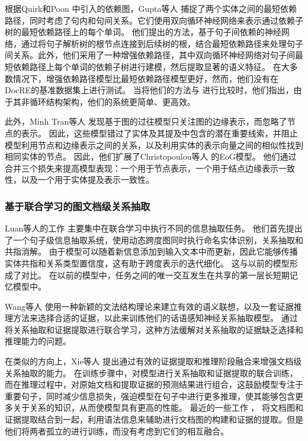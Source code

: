 \documentclass[bachelor]{thesis-uestc}
\begin{document}
根据Quirk和Poon \cite{quirk-poon-2017-distant} 中引入的依赖图，Gupta等人 \cite{Gupta_Rajaram_Schütze_Runkler_2019} 捕捉了两个实体之间的最短依赖路径，同时考虑了句内和句间关系。它们使用双向循环神经网络来表示通过依赖子树的最短依赖路径上的每个单词。
他们提出的方法，基于句子间依赖的神经网络，通过将句子解析树的根节点连接到后续树的根，结合最短依赖路径来处理句子间关系。此外，他们采用了一种增强依赖路径，其中双向循环神经网络对句子间最短依赖路径上每个单词的依赖子树进行建模，然后提取显著的语义特征。
在大多数情况下，增强依赖路径模型比最短依赖路径模型更好，然而，他们没有在DocRE的基准数据集上进行测试。
当将他们的方法与 \cite{peng-etal-2017-cross}进行比较时，他们指出，由于其非循环结构架构，他们的系统更简单、更高效。\par

此外，Minh Tran等人 \cite{minh-tran-etal-2020-dots}发现基于图的过往模型只关注图的边缘表示，而忽略了节点的表示。
因此，这些模型错过了实体及其提及中包含的潜在重要线索，并阻止模型利用节点和边缘表示之间的关系，以及利用实体的表示向量之间的相似性找到相同实体的节点。
因此，他们扩展了Christopoulou等人 \cite{christopoulou-etal-2019-connecting}的EoG模型。
他们通过合并三个损失来提高模型表现：一个用于节点表示，一个用于结点边缘表示一致性，以及一个用于实体提及表示一致性。\par

\subsubsection{基于联合学习的图文档级关系抽取}\label{subsec:joined-graph}

Luan等人的工作 \cite{luan-etal-2019-general}主要集中在联合学习中执行不同的信息抽取任务。
他们首先提出了一个句子级信息抽取系统，使用动态跨度图同时执行命名实体识别，关系抽取和共指消解。
由于模型可以随着新信息添加到输入文本中而更新，因此它能够传播实体共指和关系类型置信度，这有助于跨度表示的迭代细化。
这与以前的模型形成了对比。
在以前的模型中，任务之间的唯一交互发生在共享的第一层长短期记忆模型中。\par

Wang等人 \cite{WANG2021107274}使用一种新颖的文法结构理论来建立有效的语义联想，以及一套证据推理方法来选择合适的证据，以此来训练他们的话语感知神经关系抽取模型。
通过将关系抽取和证据提取进行联合学习，这种方法缓解对关系抽取的证据缺乏选择和推理能力的问题。\par

在类似的方向上，Xie等人 \cite{xie2022eider}提出通过有效的证据提取和推理阶段融合来增强文档级关系抽取的能力。
在训练步骤中，对模型进行关系抽取和证据提取的联合训练，而在推理过程中，对原始文档和提取证据的预测结果进行组合，这鼓励模型专注于重要句子，同时减少信息损失，强迫模型在句子中进行更多推理，使其能够包含更多关于关系的知识，从而使模型具有更高的性能。
最近的一些工作 \cite{SagDRE, duan-etal-2022-just}， 将文档图和证据提取结合到一起，利用语法信息来辅助进行文档图的构建和证据的提取。但是他们将两者孤立的进行训练，而没有考虑到它们的相互融合。
\par
\end{document}
